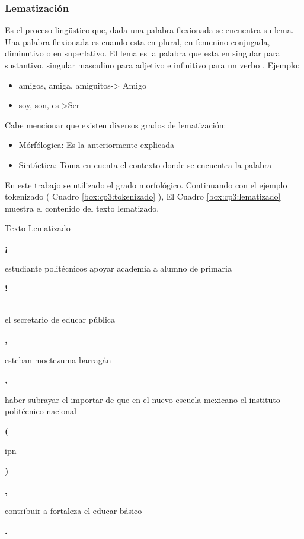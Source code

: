 
\subsubsection{Lematización}

Es el proceso lingüstico que, dada una palabra flexionada se encuentra su
lema. Una palabra flexionada es cuando esta en plural, en femenino conjugada,
diminutivo o en superlativo. El lema es la palabra que esta en singular para
sustantivo, singular masculino para adjetivo e infinitivo para un verbo \citep{CT13}. Ejemplo:

	\begin{itemize}
		\item amigos, amiga, amiguitos-> Amigo
		\item soy, son, es->Ser
	\end{itemize}

Cabe mencionar que existen diversos grados de lematización:

	\begin{itemize}
		\item Mórfólogica: Es la anteriormente explicada
		\item Sintáctica: Toma en cuenta el contexto donde se encuentra la palabra

	\end{itemize}

En este trabajo se utilizado el grado morfológico. Continuando con el ejemplo tokenizado ( Cuadro \ref{box:cp3:tokenizado} ), El Cuadro \ref{box:cp3:lematizado} muestra el contenido del texto lematizado.\\

\begin{mygraybox}[label={box:cp3:lematizado}]{Texto Lematizado} 
\begin{large}\textbf{¡}\end{large} estudiante politécnicos apoyar academia a alumno de primaria \begin{large}\textbf{!}\end{large}\\

el secretario de educar pública \begin{Large}\textbf{,}\end{Large} esteban moctezuma barragán \begin{Large}\textbf{,}\end{Large} haber subrayar el importar  de que en el nuevo escuela mexicano el instituto politécnico nacional \begin{Large}\textbf{(}\end{Large} ipn \begin{Large}\textbf{)}\end{Large} \begin{Large}\textbf{,}\end{Large} contribuir a fortaleza el educar básico \begin{Large}\textbf{.}\end{Large}
\end{mygraybox}
\ \\



